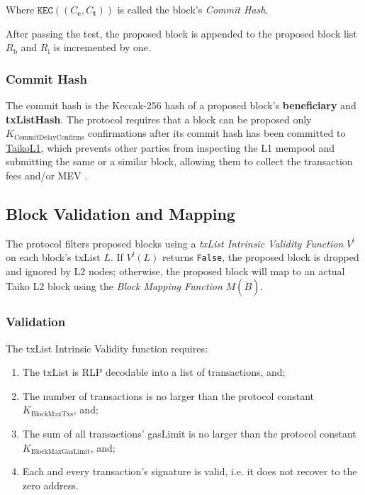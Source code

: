 \documentclass[9pt,oneside]{amsart}
\begin{document}
\begin{multicols}{2}
Where $\texttt{KEC}((C_{\mathbf{c}}, C_{\mathbf{t}}))$ is called the block's \emph{Commit Hash}.

After passing the test, the proposed block is appended to the proposed block list $R_\mathrm{b}$ and $R_\mathrm{i}$ is incremented by one.

\subsubsection{Commit Hash}\label{sec:commit} The commit hash is the Keccak-256 hash of a proposed block's \textbf{beneficiary} and \textbf{txListHash}. The protocol requires that a block can be proposed only $K_{\mathrm{CommitDelayConfirms}}$ confirmations after its commit hash has been committed to \underline{TaikoL1}, which prevents other parties from inspecting the L1 mempool and submitting the same or a similar block, allowing them to collect the transaction fees and/or MEV \cite{mev}.

\subsection{Block Validation and Mapping } \label{sec:filtermap}
The protocol filters proposed blocks using a \emph{txList Intrinsic Validity Function} $V^l$ on each block's txList $L$. If $V^l(L)$ returns \texttt{False}, the proposed block is dropped and ignored by L2 nodes; otherwise, the proposed block will map to an actual Taiko L2 block using the \emph{Block Mapping Function} $M(\dot{B})$.

\subsubsection{Validation} The txList Intrinsic Validity function requires:

\begin{enumerate}
\item The txList is RLP decodable into a list of transactions, and;
\item The number of transactions is no larger than the protocol constant $ K_{\mathrm{BlockMaxTxs}}$, and;
\item The sum of all transactions' gasLimit is no larger than the protocol constant $K_{\mathrm{BlockMaxGasLimit}}$, and;
\item Each and every transaction's signature is valid, i.e. it does not recover to the zero address.
\end{enumerate}


\end{multicols}
\end{document}
